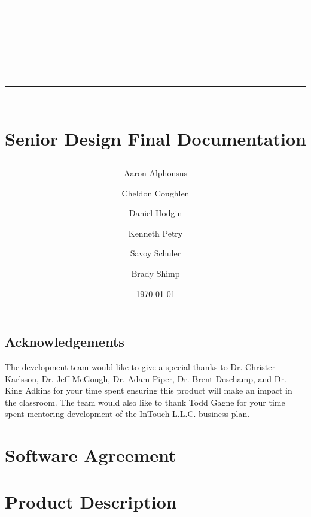 \documentclass{book}
\title{{\color{SDColor3} \rule{\linewidth}{0.5mm}}\\[2mm] {\huge \bfseries \color{SDColor3} \teamName}\\[-1mm] {\color{SDColor3}\rule{\linewidth}{0.5mm}} \\  \vfill
{\LARGE \bfseries \color{SDColor4} Senior Design Final Documentation }\\  \vfill 
{\color{SDColor3} \teamName} }
\author
{
	\color{SDColor3} Aaron Alphonsus 
	\and \color{SDColor3} Cheldon Coughlen 
	\and \color{SDColor3} Daniel Hodgin 
	\and \color{SDColor3} Kenneth Petry 
	\and \color{SDColor3} Savoy Schuler
	\and \color{SDColor3} Brady Shimp
}
\date{\color{SDColor3} \today}
\begin{document}
\frontmatter

\maketitle

\vspace*{\fill}

\section*{Acknowledgements}
\label{SpecialThanks}  
The development team would like to give a special thanks to Dr. Christer Karlsson, Dr. Jeff McGough, Dr. Adam Piper, Dr. Brent Deschamp, and Dr. King Adkins for your time spent ensuring this product will make an impact in the classroom.  The team would also like to thank Todd Gagne for your time spent mentoring development of the InTouch L.L.C. business plan. 

\vspace*{\fill}

\tableofcontents
{}
\listoffigures
{}
\listoftables
{}

\mainmatter




\agreement

\chapter{Software Agreement}


\appendix

\chapter{Product Description}






\backmatter
\end{document}

